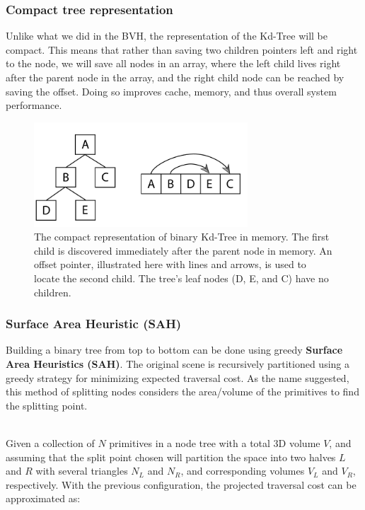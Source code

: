 \documentclass[11pt,a4paper]{article}
\begin{document}
\subsubsection{Compact tree representation}
Unlike what we did in the BVH, the representation of the Kd-Tree will be compact. This means that rather than saving two children pointers left and right to the node, we will save all nodes in an array, where the left child lives right after the parent node in the array, and the right child node can be reached by saving the offset. Doing so improves cache, memory, and thus overall system performance.


\begin{figure}[h]	
     \centering
     \captionsetup{justification=centering,margin=2cm}
     \includegraphics[width=8cm]{images/kdtree/compact.png}
     \caption{The compact representation of binary Kd-Tree in memory. The first child is discovered immediately after the parent node in memory. An offset pointer, illustrated here with lines and arrows, is used to locate the second child. The tree's leaf nodes (D, E, and C) have no children. \protect\cite{Pharr2016}}
        \label{fig:dice}
\end{figure}


\subsubsection{Surface Area Heuristic (SAH)}
Building a binary tree from top to bottom can be done using greedy \textbf{Surface Area Heuristics (SAH)}. The original scene is recursively partitioned using a greedy strategy for minimizing expected traversal cost. As the name suggested, this method of splitting nodes considers the area/volume of the primitives to find the splitting point.

\noindent
\\
Given a collection of $N$ primitives in a node tree with a total 3D volume $V$, and assuming that the split point chosen will partition the space into two halves $L$ and $R$ with several triangles $N_L$ and $N_R$, and corresponding volumes $V_L$ and $V_R$, respectively. With the previous configuration, the projected traversal cost can be approximated as:
\end{document}
